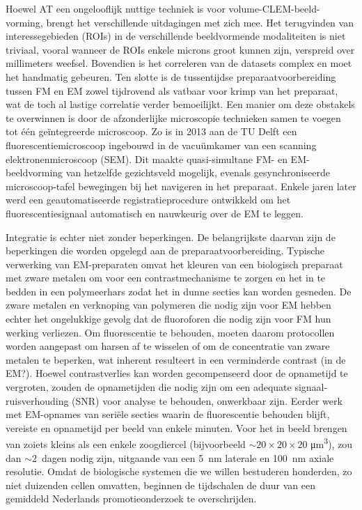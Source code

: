 Hoewel AT een ongelooflijk nuttige techniek is voor volume-CLEM-beeld-vorming, brengt het verschillende uitdagingen met zich mee. Het terugvinden van interessegebieden (ROIs) in de verschillende beeldvormende modaliteiten is niet triviaal, vooral wanneer de ROIs enkele microns groot kunnen zijn, verspreid over millimeters weefsel. Bovendien is het correleren van de datasets complex en moet het handmatig gebeuren. Ten slotte is de tussentijdse preparaatvoorbereiding tussen FM en EM zowel tijdrovend als vatbaar voor krimp van het preparaat, wat de toch al lastige correlatie verder bemoeilijkt. Een manier om deze obstakels te overwinnen is door de afzonderlijke microscopie technieken samen te voegen tot één geïntegreerde microscoop. Zo is in 2013 aan de TU Delft een fluorescentiemicroscoop ingebouwd in de vacuümkamer van een scanning elektronenmicroscoop (SEM). Dit maakte quasi-simultane FM- en EM-beeldvorming van hetzelfde gezichtsveld mogelijk, evenals gesynchroniseerde microscoop-tafel bewegingen bij het navigeren in het preparaat. Enkele jaren later werd een geautomatiseerde registratieprocedure ontwikkeld om het fluorescentiesignaal automatisch en nauwkeurig over de EM te leggen.

Integratie is echter niet zonder beperkingen. De belangrijkste daarvan zijn de beperkingen die worden opgelegd aan de preparaatvoorbereiding. Typische verwerking van EM-preparaten omvat het kleuren van een biologisch preparaat met zware metalen om voor een contrastmechanisme te zorgen en het in te bedden in een polymeerhars zodat het in dunne secties kan worden gesneden. De zware metalen en verknoping van polymeren die nodig zijn voor EM hebben echter het ongelukkige gevolg dat de fluoroforen die nodig zijn voor FM hun werking verliezen. Om fluorescentie te behouden, moeten daarom protocollen worden aangepast om harsen af te wisselen of om de concentratie van zware metalen te beperken, wat inherent resulteert in een verminderde contrast (in de EM?). Hoewel contrastverlies kan worden gecompenseerd door de opnametijd te vergroten, zouden de opnametijden die nodig zijn om een adequate signaal-ruisverhouding (SNR) voor analyse te behouden, onwerkbaar zijn. Eerder werk met EM-opnames van seriële secties waarin de fluorescentie behouden blijft, vereiste en opnametijd per beeld van enkele minuten. Voor het in beeld brengen van zoiets kleins als een enkele zoogdiercel (bijvoorbeeld ${\sim}\text{20} \times \text{20} \times \text{20}$ \si{\micro\meter^3}), zou dan ${\sim}$\SI{2}{dagen} nodig zijn, uitgaande van een \SI{5}{\nano\meter} laterale en \SI{100}{\nano\meter} axiale resolutie. Omdat de biologische systemen die we willen bestuderen honderden, zo niet duizenden cellen omvatten, beginnen de tijdschalen de duur van een gemiddeld Nederlands promotieonderzoek te overschrijden.

